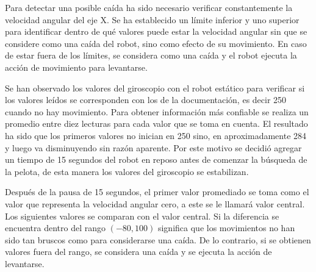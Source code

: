 Para detectar una posible caída ha sido necesario verificar constantemente la velocidad angular del eje X. Se ha establecido un límite inferior y uno superior para identificar dentro de qué valores puede estar la velocidad angular sin que se considere como una caída del robot, sino como efecto de su movimiento. En caso de estar fuera de los límites, se considera como una caída y el robot ejecuta la acción de movimiento para levantarse.  

Se han observado los valores del giroscopio con el robot estático para verificar si los valores leídos se corresponden con los de la documentación, es decir 250 cuando no hay movimiento. Para obtener información más confiable se realiza un promedio entre diez lecturas para cada valor que se toma en cuenta. El resultado ha sido que los primeros valores no inician en 250 sino, en aproximadamente 284 y luego va disminuyendo sin razón aparente. Por este motivo se decidió agregar un tiempo de 15 segundos del robot en reposo antes de comenzar la búsqueda de la pelota, de esta manera los valores del giroscopio se estabilizan. 

Después de la pausa de 15 segundos, el primer valor promediado se toma como el valor que representa la velocidad angular cero, a este se le llamará valor central. Los siguientes valores se comparan con el valor central. Si la diferencia se encuentra dentro del rango $(-80,100)$ significa que los movimientos no han sido tan bruscos como para considerarse una caída. De lo contrario, si se obtienen valores fuera del rango, se considera una caída y se ejecuta la acción de levantarse.   


